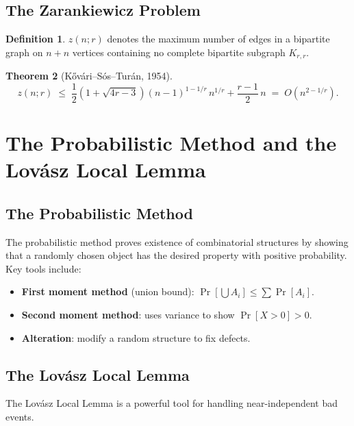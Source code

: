 \documentclass[12pt,a4paper]{amsart}
\newtheorem{theorem}{Theorem}[section]
\theoremstyle{definition}
\newtheorem{definition}[theorem]{Definition}
\theoremstyle{remark}
\begin{document}
\subsection{The Zarankiewicz Problem}

\begin{definition}
$z(n;r)$ denotes the maximum number of edges in a bipartite graph on $n+n$
vertices containing no complete bipartite subgraph $K_{r,r}$.
\end{definition}

\begin{theorem}[K\H{o}v\'ari--S\'os--Tur\'an, 1954]
\[
  z(n;r) \;\le\; \frac{1}{2}\left(1 + \sqrt{4r-3}\right)(n-1)^{1-1/r}\,n^{1/r}
  + \frac{r-1}{2}\,n \;=\; O\!\left(n^{2-1/r}\right).
\]
\end{theorem}

\section{The Probabilistic Method and the Lov\'asz Local Lemma}
\label{sec:lll}

\subsection{The Probabilistic Method}

The probabilistic method proves existence of combinatorial structures by showing
that a randomly chosen object has the desired property with positive probability.
Key tools include:
\begin{itemize}[noitemsep]
  \item \textbf{First moment method} (union bound): $\Pr[\bigcup A_i] \le \sum \Pr[A_i]$.
  \item \textbf{Second moment method}: uses variance to show $\Pr[X > 0] > 0$.
  \item \textbf{Alteration}: modify a random structure to fix defects.
\end{itemize}

\subsection{The Lov\'asz Local Lemma}

The Lov\'asz Local Lemma \cite{ErdosLovasz1975} is a powerful tool for handling
near-independent bad events.
\end{document}
